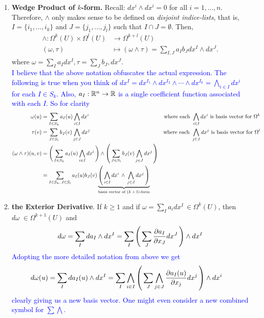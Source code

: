\documentclass[10pt,a4paper]{report}
\newcommand{\BLUE}[1]{\textcolor{blue}{#1}}
\begin{document}
\begin{enumerate}
	\item \textbf{Wedge Product of $k$-form.} Recall: $dx^i\wedge dx^i =0$ for all $i=1,\dots,n$.  Therefore, $\wedge$ only makes sense to be defined on \textit{disjoint indice-lists}, that is, $I=\{i_1, \dots, i_k\}$ and $J=\{j_1, \dots, j_l\}$ such that $I\cap J =\emptyset$.  Then,
		\begin{align*}
			\wedge : \Omega^k(U) \times \Omega^l(U) &\to \Omega^{k+l}(U)\\
			(\omega, \tau) &\mapsto (\omega\wedge\tau)=\sum_{I,J} a_Ib_J dx^I\wedge dx^J.
		\end{align*}where $\omega = \sum_I a_Idx^I, \tau=\sum_J b_J,dx^J$.\\
		\BLUE{I believe that the above notation obfuscates the actual expression. The following is true when you think of $dx^I= dx^{I_1}\wedge dx^{I_2}\wedge\cdots\wedge dx^{I_k} = \bigwedge_{i \in I} dx^i$ for each $I \in S_k$. Also, $a_I:\mathbb{R}^n \to \mathbb{R}$ is a single coefficient function associated with each $I$. So for clarity
		\begin{align*}
			\omega(u) &= \sum_{I\in S_k} a_I(u) \bigwedge_{i\in I} dx^i & \text{where each } \bigwedge_{i\in I} dx^i \text{ is  basis vector for } \Omega^k\\
			\tau(v) &= \sum_{J\in S_l} b_J(v) \bigwedge_{j\in J} dx^j & \text{where each } \bigwedge_{j\in J} dx^j \text{ is  basis vector for } \Omega^l \\
			(\omega \wedge \tau)(u,v) &= \left (\, \sum_{I\in S_k} a_I(u) \bigwedge_{i\in I} dx^i \,\right )\wedge\left (\, \sum_{J\in S_l} b_J(v) \bigwedge_{j\in J} dx^j \,\right ) \\
			&= \sum_{I\in S_k,\,J\in S_l} a_I(u)b_J(v)\underbrace{\left (\,  \bigwedge_{i\in I} dx^i \, \wedge \, \bigwedge_{j\in J} dx^j  \,\right )}_{\text{basis vector of $(k+l)$-form}}
		\end{align*}
		}
	\item \textbf{the Exterior Derivative}.  If $k\ge 1$ and if $\omega=\sum_Ia_idx^I\,\in \Omega^k(U)$, then $d\omega \; \in \Omega^{k+1}(U)$ and 
	\begin{align*}
		d\omega = \sum_Ida_I\wedge dx^I = \sum_I\left (\, \sum_J\frac{\partial a_I}{\partial x_J}dx^J \,\right )\wedge dx^I
	\end{align*}
	\BLUE{Adopting the more detailed notation from above we get
	\begin{align*}
		d\omega(u) &= \sum_Ida_I(u)\wedge dx^I = \sum_I \bigwedge_{i\in I}\left (\, \sum_J\bigwedge_{j\in J}\frac{\partial a_I(u)}{\partial x_j} dx^j \,\right )\wedge dx^i
	\end{align*}clearly giving us a new basis vector.  One might even consider a new combined symbol for $\sum\bigwedge$.
	}
	

\end{enumerate}
\end{document}
